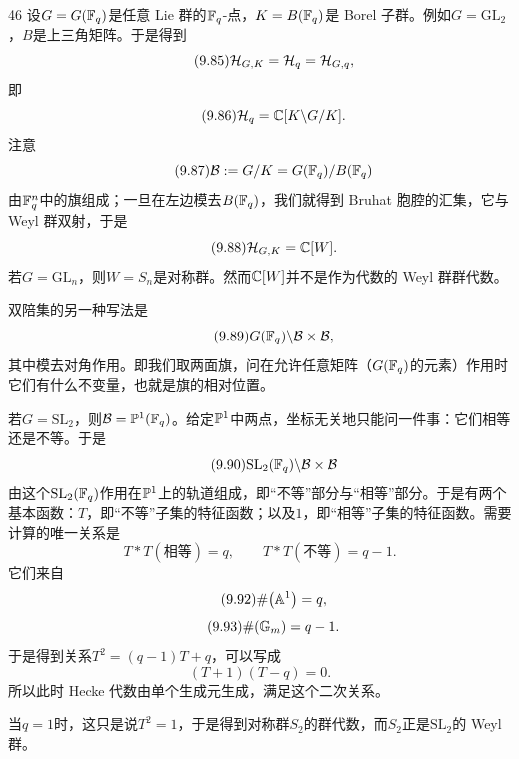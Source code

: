 \begin{srcex}{46}
设$G=G(\mathbb{F}_q)$是任意 Lie 群的$\mathbb{F}_q$-点，$K=B(\mathbb{F}_q)$是 Borel 子群。例如$G=\mathrm{GL}_2$，$B$是上三角矩阵。于是得到
\begin{equation}\tag{9.85}
\mathcal{H}_{G,K}=\mathcal{H}_q=\mathcal{H}_{G,q},
\end{equation}
即
\begin{equation}\tag{9.86}
\mathcal{H}_q=\mathbb{C}[K\backslash G/K].
\end{equation}
注意
\begin{equation}\tag{9.87}
\mathcal B:=G/K=G(\mathbb{F}_q)/B(\mathbb{F}_q)
\end{equation}
由$\mathbb{F}_q^{n}$中的旗组成；一旦在左边模去$B(\mathbb{F}_q)$，我们就得到 Bruhat 胞腔的汇集，它与 Weyl 群双射，于是
\begin{equation}\tag{9.88}
\mathcal{H}_{G,K}=\mathbb{C}[W].
\end{equation}
若$G=\mathrm{GL}_n$，则$W=S_n$是对称群。然而$\mathbb{C}[W]$并不是作为代数的 Weyl 群群代数。

双陪集的另一种写法是
\begin{equation}\tag{9.89}
G(\mathbb{F}_q)\backslash\mathcal B\times\mathcal B,
\end{equation}
其中模去对角作用。即我们取两面旗，问在允许任意矩阵（$G(\mathbb{F}_q)$的元素）作用时它们有什么不变量，也就是旗的相对位置。

若$G=\mathrm{SL}_2$，则$\mathcal B=\mathbb{P}^{1}(\mathbb{F}_q)$。给定$\mathbb{P}^{1}$中两点，坐标无关地只能问一件事：它们相等还是不等。于是
\begin{equation}\tag{9.90}
\mathrm{SL}_2(\mathbb{F}_q)\backslash\mathcal B\times\mathcal B
\end{equation}
由这个$\mathrm{SL}_2(\mathbb{F}_q)$作用在$\mathbb{P}^{1}$上的轨道组成，即“不等”部分与“相等”部分。于是有两个基本函数：$T$，即“不等”子集的特征函数；以及$1$，即“相等”子集的特征函数。需要计算的唯一关系是
\begin{equation}\tag{9.91}
T*T(\text{相等})=q,\qquad T*T(\text{不等})=q-1.
\end{equation}
它们来自
\begin{equation}\tag{9.92}
\#\bigl(\mathbb{A}^{1}\bigr)=q,
\end{equation}
\begin{equation}\tag{9.93}
\#(\mathbb{G}_m)=q-1.
\end{equation}
于是得到关系$T^{2}=(q-1)T+q$，可以写成
\begin{equation}\tag{9.94}
(T+1)(T-q)=0.
\end{equation}
所以此时 Hecke 代数由单个生成元生成，满足这个二次关系。

当$q=1$时，这只是说$T^{2}=1$，于是得到对称群$S_2$的群代数，而$S_2$正是$\mathrm{SL}_2$的 Weyl 群。
\end{srcex}

